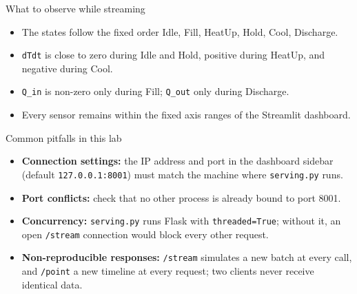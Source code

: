 \begin{frame}{What to observe while streaming}
\begin{itemize}
\item The states follow the fixed order Idle, Fill, HeatUp, Hold, Cool, Discharge.
\item \texttt{dTdt} is close to zero during Idle and Hold, positive during HeatUp, and negative during Cool.
\item \texttt{Q\_in} is non-zero only during Fill; \texttt{Q\_out} only during Discharge.
\item Every sensor remains within the fixed axis ranges of the Streamlit dashboard.
\end{itemize}
\coursefooter
\end{frame}

\begin{frame}{Common pitfalls in this lab}
\begin{itemize}
\item \textbf{Connection settings:} the IP address and port in the dashboard sidebar (default \texttt{127.0.0.1:8001}) must match the machine where \texttt{serving.py} runs.
\item \textbf{Port conflicts:} check that no other process is already bound to port 8001.
\item \textbf{Concurrency:} \texttt{serving.py} runs Flask with \texttt{threaded=True}; without it, an open \texttt{/stream} connection would block every other request.
\item \textbf{Non-reproducible responses:} \texttt{/stream} simulates a new batch at every call, and \texttt{/point} a new timeline at every request; two clients never receive identical data.
\end{itemize}
\coursefooter
\end{frame}

